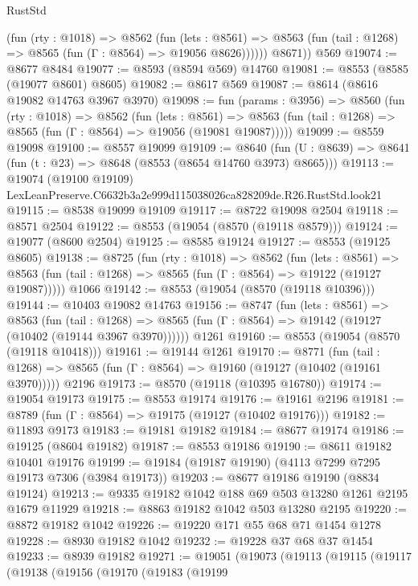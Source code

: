 \begin{lexlean}{RustStd}
\begin{coremodule}
            (fun (rty : @1018) =>
            @8562
              (fun (lets : @8561) =>
              @8563 (fun (tail : @1268) => @8565 (fun (Γ : @8564) => @19056 @8626))))))
        @8671))
    @569
@19074 := @8677 @8484
@19077 := @8593 (@8594 @569) @14760
@19081 := @8553 (@8585 (@19077 @8601) @8605)
@19082 := @8617 @569
@19087 := @8614 (@8616 @19082 @14763 @3967 @3970)
@19098 := fun (params : @3956) =>
  @8560
    (fun (rty : @1018) =>
    @8562
      (fun (lets : @8561) =>
      @8563 (fun (tail : @1268) => @8565 (fun (Γ : @8564) => @19056 (@19081 @19087)))))
@19099 := @8559 @19098
@19100 := @8557 @19099
@19109 := @8640
    (fun (U : @8639) => @8641 (fun (t : @23) => @8648 (@8553 (@8654 @14760 @3973) @8665)))
@19113 := @19074
    (@19100 @19109)
    LexLeanPreserve.C6632b3a2e999d115038026ca828209de.R26.RustStd.look21
@19115 := @8538 @19099 @19109
@19117 := @8722 @19098 @2504
@19118 := @8571 @2504
@19122 := @8553 (@19054 (@8570 (@19118 @8579)))
@19124 := @19077 (@8600 @2504)
@19125 := @8585 @19124
@19127 := @8553 (@19125 @8605)
@19138 := @8725
    (fun (rty : @1018) =>
    @8562
      (fun (lets : @8561) =>
      @8563 (fun (tail : @1268) => @8565 (fun (Γ : @8564) => @19122 (@19127 @19087)))))
    @1066
@19142 := @8553 (@19054 (@8570 (@19118 @10396)))
@19144 := @10403 @19082 @14763
@19156 := @8747
    (fun (lets : @8561) =>
    @8563
      (fun (tail : @1268) =>
      @8565 (fun (Γ : @8564) => @19142 (@19127 (@10402 (@19144 @3967 @3970))))))
    @1261
@19160 := @8553 (@19054 (@8570 (@19118 @10418)))
@19161 := @19144 @1261
@19170 := @8771
    (fun (tail : @1268) => @8565 (fun (Γ : @8564) => @19160 (@19127 (@10402 (@19161 @3970)))))
    @2196
@19173 := @8570 (@19118 (@10395 @16780))
@19174 := @19054 @19173
@19175 := @8553 @19174
@19176 := @19161 @2196
@19181 := @8789 (fun (Γ : @8564) => @19175 (@19127 (@10402 @19176)))
@19182 := @11893 @9173
@19183 := @19181 @19182
@19184 := @8677 @19174
@19186 := @19125 (@8604 @19182)
@19187 := @8553 @19186
@19190 := @8611 @19182 @10401 @19176
@19199 := @19184 (@19187 @19190) (@4113 @7299 @7295 @19173 @7306 (@3984 @19173))
@19203 := @8677 @19186 @19190 (@8834 @19124)
@19213 := @9335 @19182 @1042 @188 @69 @503 @13280 @1261 @2195 @1679 @11929
@19218 := @8863 @19182 @1042 @503 @13280 @2195
@19220 := @8872 @19182 @1042
@19226 := @19220 @171 @55 @68 @71 @1454 @1278
@19228 := @8930 @19182 @1042
@19232 := @19228 @37 @68 @37 @1454
@19233 := @8939 @19182
@19271 := @19051
    (@19073
      (@19113
        (@19115
          (@19117
            (@19138
              (@19156
                (@19170
                  (@19183
                    (@19199

\end{coremodule}
\end{lexlean}
